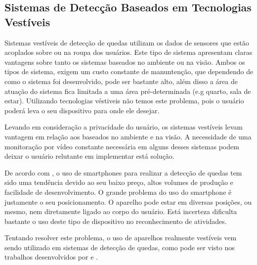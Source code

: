 \subsection{Sistemas de Detecção Baseados em Tecnologias Vestíveis}
Sistemas vestíveis de detecção de quedas utilizam os dados de sensores que estão acoplados sobre ou na roupa dos usuários. Este tipo de sistema apresentam claras vantagens sobre tanto os sistemas baseados no ambiente ou na visão. Ambos os tipos de sistema, exigem um custo constante de manuntenção, que dependendo de como o sistema foi desenvolvido, pode ser bastante alto, além disso a área de atuação do sistema fica limitada a uma área pré-determinada (e.g quarto, sala de estar). Utilizando tecnologias véstiveis não temos este problema, pois o usuário poderá leva o seu dispositivo para onde ele desejar.

Levando em consideração a privacidade do usuário, os sistemas vestíveis levam vantagem em relação aos baseados no ambiente e na visão. A necessidade de uma monitoração por vídeo constante necessária em alguns desses sistemas podem deixar o usuário relutante em implementar está solução. 

De acordo com \cite{igual2013challenges}, o uso de smartphones para realizar a detecção de quedas tem sido uma tendência devido ao seu baixo preço, altos volumes de produção e facilidade de desenvolvimento. O grande problema do uso do smartphone é justamente o seu posicionamento. O aparelho pode estar em diversas posições, ou mesmo, nem diretamente ligado ao corpo do usuário. Está incerteza dificulta bastante o uso deste tipo de dispositivo no reconhecimento de atividades. 

Tentando resolver este problema, o uso de aparelhos realmente vestíveis vem sendo utilizado em sistemas de detecção de quedas, como pode ser visto nos trabalhos desenvolvidos por \cite{hsieh2014wrist} e \cite{pivato2011wearable}.


